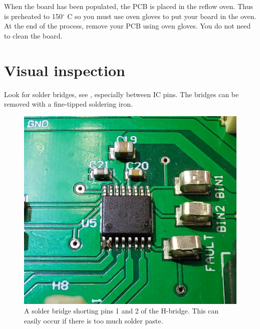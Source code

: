 When the board has been populated, the PCB is placed in the reflow
oven.  Thus is preheated to 150$^{\circ}$ C so you must use oven gloves to
put your board in the oven.  At the end of the process, remove your
PCB using oven gloves.  You do not need to clean the board.


\section{Visual inspection}

Look for solder bridges, see , especially
between IC pins.  The bridges can be removed with a fine-tipped
soldering iron.

\begin{figure}[!h]
  \centering
  \includegraphics[width=6in]{figs/solder_bridge.jpg}
  \caption{A solder bridge shorting pins 1 and 2 of the H-bridge.
    This can easily occur if there is too much solder paste.}
  \label{fig:solder-bridge}
\end{figure}
